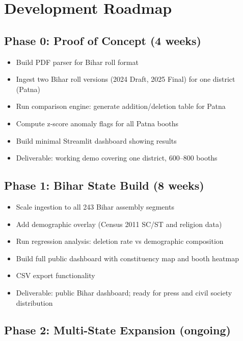 \documentclass[11pt, a4paper]{article}
\begin{document}
\section{Development Roadmap}

\subsection{Phase 0: Proof of Concept (4 weeks)}

\begin{itemize}[leftmargin=1.5em, itemsep=3pt]
  \item[$\rightarrow$] Build PDF parser for Bihar roll format
  \item[$\rightarrow$] Ingest two Bihar roll versions (2024 Draft, 2025 Final) for one district (Patna)
  \item[$\rightarrow$] Run comparison engine: generate addition/deletion table for Patna
  \item[$\rightarrow$] Compute z-score anomaly flags for all Patna booths
  \item[$\rightarrow$] Build minimal Streamlit dashboard showing results
  \item[$\rightarrow$] Deliverable: working demo covering one district, 600--800 booths
\end{itemize}

\subsection{Phase 1: Bihar State Build (8 weeks)}

\begin{itemize}[leftmargin=1.5em, itemsep=3pt]
  \item[$\rightarrow$] Scale ingestion to all 243 Bihar assembly segments
  \item[$\rightarrow$] Add demographic overlay (Census 2011 SC/ST and religion data)
  \item[$\rightarrow$] Run regression analysis: deletion rate vs demographic composition
  \item[$\rightarrow$] Build full public dashboard with constituency map and booth heatmap
  \item[$\rightarrow$] CSV export functionality
  \item[$\rightarrow$] Deliverable: public Bihar dashboard; ready for press and civil society distribution
\end{itemize}

\subsection{Phase 2: Multi-State Expansion (ongoing)}
\end{document}
